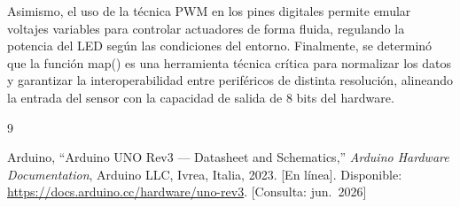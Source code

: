Asimismo, el uso de la técnica PWM en los pines digitales permite emular voltajes variables para controlar actuadores de forma fluida, regulando la potencia del LED según las condiciones del entorno. Finalmente, se determinó que la función map() es una herramienta técnica crítica para normalizar los datos y garantizar la interoperabilidad entre periféricos de distinta resolución, alineando la entrada del sensor con la capacidad de salida de 8 bits del hardware.

\begingroup
\small
\begin{thebibliography}{9}

Arduino, ``Arduino UNO Rev3 --- Datasheet and Schematics,''
\emph{Arduino Hardware Documentation}, Arduino LLC, Ivrea, Italia, 2023.
[En línea]. Disponible: \url{https://docs.arduino.cc/hardware/uno-rev3}.
[Consulta: jun.~2026]

\end{thebibliography}
\endgroup

